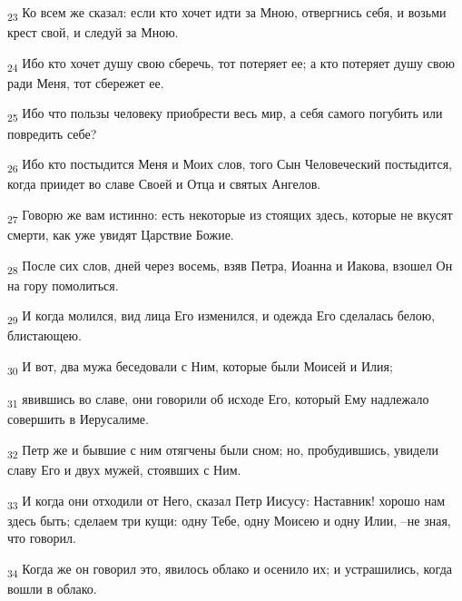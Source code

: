 \begin{tcolorbox}
\textsubscript{23} Ко всем же сказал: если кто хочет идти за Мною, отвергнись себя, и возьми крест свой, и следуй за Мною.
\end{tcolorbox}
\begin{tcolorbox}
\textsubscript{24} Ибо кто хочет душу свою сберечь, тот потеряет ее; а кто потеряет душу свою ради Меня, тот сбережет ее.
\end{tcolorbox}
\begin{tcolorbox}
\textsubscript{25} Ибо что пользы человеку приобрести весь мир, а себя самого погубить или повредить себе?
\end{tcolorbox}
\begin{tcolorbox}
\textsubscript{26} Ибо кто постыдится Меня и Моих слов, того Сын Человеческий постыдится, когда приидет во славе Своей и Отца и святых Ангелов.
\end{tcolorbox}
\begin{tcolorbox}
\textsubscript{27} Говорю же вам истинно: есть некоторые из стоящих здесь, которые не вкусят смерти, как уже увидят Царствие Божие.
\end{tcolorbox}
\begin{tcolorbox}
\textsubscript{28} После сих слов, дней через восемь, взяв Петра, Иоанна и Иакова, взошел Он на гору помолиться.
\end{tcolorbox}
\begin{tcolorbox}
\textsubscript{29} И когда молился, вид лица Его изменился, и одежда Его сделалась белою, блистающею.
\end{tcolorbox}
\begin{tcolorbox}
\textsubscript{30} И вот, два мужа беседовали с Ним, которые были Моисей и Илия;
\end{tcolorbox}
\begin{tcolorbox}
\textsubscript{31} явившись во славе, они говорили об исходе Его, который Ему надлежало совершить в Иерусалиме.
\end{tcolorbox}
\begin{tcolorbox}
\textsubscript{32} Петр же и бывшие с ним отягчены были сном; но, пробудившись, увидели славу Его и двух мужей, стоявших с Ним.
\end{tcolorbox}
\begin{tcolorbox}
\textsubscript{33} И когда они отходили от Него, сказал Петр Иисусу: Наставник! хорошо нам здесь быть; сделаем три кущи: одну Тебе, одну Моисею и одну Илии, --не зная, что говорил.
\end{tcolorbox}
\begin{tcolorbox}
\textsubscript{34} Когда же он говорил это, явилось облако и осенило их; и устрашились, когда вошли в облако.
\end{tcolorbox}
